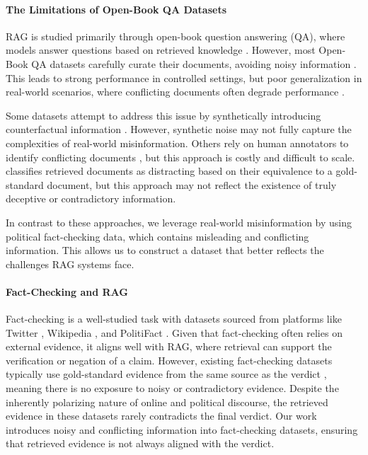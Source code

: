 \paragraph{The Limitations of Open-Book QA Datasets}
RAG is studied primarily through open-book question answering (QA), where models answer questions based on retrieved knowledge \cite{gao2024retrievalaugmentedgenerationlargelanguage}. However, most Open-Book QA datasets carefully curate their documents, avoiding noisy information \citep{TriviaQA, HotPotQA, SQUAD, NaturalQuestions, IfQA, SearchQA, Freebase, ScienceQA}. This leads to strong performance in controlled settings, but poor generalization in real-world scenarios, where conflicting documents often degrade performance \citep{PowerOfNoise}.

Some datasets attempt to address this issue by synthetically introducing counterfactual information \cite{raat,NoiserBench}. However, synthetic noise may not fully capture the complexities of real-world misinformation. Others rely on human annotators to identify conflicting documents \cite{qacc}, but this approach is costly and difficult to scale. %
\cite{PowerOfNoise} classifies retrieved documents as distracting based on their equivalence to a gold-standard document, but this approach may not reflect the existence of truly deceptive or contradictory information.

In contrast to these approaches, we leverage real-world misinformation by using political fact-checking data, which contains misleading and conflicting information. This allows us to construct a dataset that better reflects the challenges RAG systems face.

\paragraph{Fact-Checking and RAG}
Fact-checking is a well-studied task with datasets sourced from platforms like Twitter \citep{nielsen2022mumin}, Wikipedia \citep{FEVER}, and PolitiFact \citep{PolitifactOslo, Liar, LiarPlus, mocheg, FakeNewsNet}. Given that fact-checking often relies on external evidence, it aligns well with RAG, where retrieval can support the verification or negation of a claim. However, existing fact-checking datasets typically use gold-standard evidence from the same source as the verdict \cite{FEVER,snopes,pubhealth,multifc,mocheg}, meaning there is no exposure to noisy or contradictory evidence. Despite the inherently polarizing nature of online and political discourse, the retrieved evidence in these datasets rarely contradicts the final verdict. Our work introduces noisy and conflicting information into fact-checking datasets, ensuring that retrieved evidence is not always aligned with the verdict.